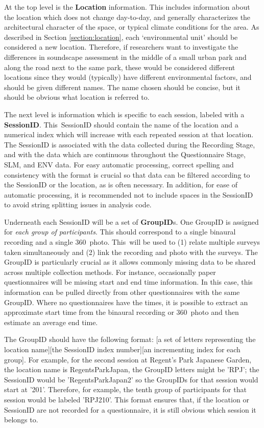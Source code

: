      At the top level is the \textbf{Location} information. This includes information about the location which does not change day-to-day, and generally characterizes the architectural character of the space, or typical climate conditions for the area. As described in Section \ref{section:location}, each `environmental unit' should be considered a new location. Therefore, if researchers want to investigate the differences in soundscape assessment in the middle of a small urban park and along the road next to the same park, these would be considered different locations since they would (typically) have different environmental factors, and should be given different names. The name chosen should be concise, but it should be obvious what location is referred to.

     The next level is information which is specific to each session, labeled with a \textbf{SessionID}. This~SessionID should contain the name of the location and a numerical index which will increase with each repeated session at that location. The SessionID is associated with the data collected during the Recording Stage, and with the data which are continuous throughout the Questionnaire Stage, SLM, and ENV data. For easy automatic processing, correct spelling and consistency with the format is crucial so that data can be filtered according to the SessionID or the location, as is often necessary. In addition,  for ease of automatic processing, it is recommended not to include spaces in the SessionID to avoid string splitting issues in analysis code.

     Underneath each SessionID will be a set of \textbf{GroupID}s. One GroupID is assigned for \textit{each group of participants}. This should correspond to a single binaural recording and a single 360\degree~photo. This~will be used to (1) relate multiple surveys taken simultaneously and (2) link the recording and photo with the surveys. The GroupID is particularly crucial as it allows commonly missing data to be shared across multiple collection methods. For instance, occasionally paper questionnaires will be missing start and end time information. In this case, this information can be pulled directly from other questionnaires with the same GroupID. Where no questionnaires have the times, it is possible to extract an approximate start time from the binaural recording or 360\degree~photo and then estimate an average end time.

     The GroupID should have the following format: [a set of letters representing the location name][the SessionID index number][an incrementing index for each group]. For example, for the second session at Regent's Park Japanese Garden, the location name is RegentsParkJapan, the GroupID letters might be 'RPJ'; the SessionID would be 'RegentsParkJapan2' so the GroupIDs for that session would start at '201'. Therefore, for example, the tenth group of participants for that session would be labeled 'RPJ210'. This format ensures that, if the location or SessionID are not recorded for a questionnaire, it is still obvious which session it belongs to.


